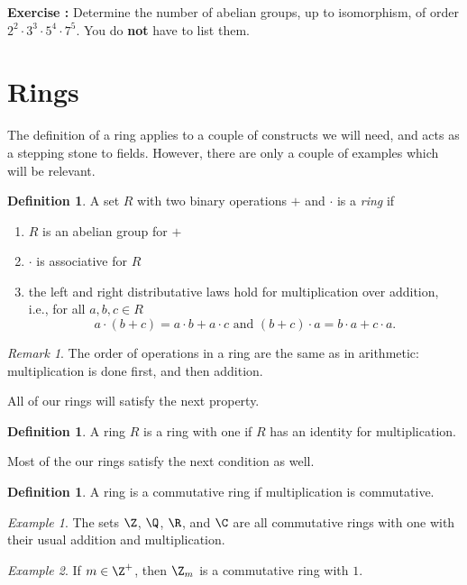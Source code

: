 \documentclass[12pt]{amsart}
\newcommand{\terminology}[1]{\textbf{\textit{#1}}}
\renewcommand{\terminology}[1]{#1}
\newcommand{\term}{\terminology}
\newcounter{probs}
\newenvironment{prob}{%
  \refstepcounter{probs}
  \par\medskip\noindent\textbf{Exercise \theprobs:} }{\par\medskip}
\theoremstyle{plain}
\theoremstyle{definition}
\newtheorem{defn}[thm]{Definition}
\theoremstyle{remark}
\newtheorem*{remark}{Remark}
\newtheorem*{exam}{Example}
\begin{document}
\begin{prob}
 Determine the number of abelian groups, up to isomorphism, of order
 $2^2\cdot 3^3\cdot 5^4\cdot 7^5$.  You do \textbf{not} have to list them.
\end{prob}

\section{Rings}
The definition of a ring applies to a couple of constructs we will
need, and acts as a stepping stone to fields.  However, there are only
a couple of examples which will be relevant.

\begin{defn}
  A set $R$ with two binary operations $+$ and $\cdot$ is a \emph{ring}
  if 
  \begin{enumerate}
  \item $R$ is an abelian group for $+$
  \item $\cdot $ is associative for $R$
  \item the left and right distributative laws hold for multiplication
    over addition, i.e., for all $a,b,c\in R$
    \[a\cdot(b+c) = a\cdot b+a\cdot c \text{ and } (b+c)\cdot a=b\cdot
    a+c\cdot a.\]
  \end{enumerate}
\end{defn}
\begin{remark}
  The order of operations in a ring are the same as in arithmetic:
  multiplication is done first, and then addition.
\end{remark}
All of our rings will satisfy the next property.
\begin{defn}
  A ring $R$ is a \term{ring with one} if $R$ has an identity for
  multiplication.
\end{defn}
Most of the our rings satisfy the next condition as well.
\begin{defn}
  A ring is a \term{commutative ring} if multiplication is
  commutative.
\end{defn}

\begin{exam}
  The sets $\Z$, $\Q$, $\R$, and $\C$ are all commutative rings with
  one with their usual addition and multiplication.
\end{exam}

\begin{exam}
  If $m\in\Z^+$, then $\Z_m$ is a commutative ring with $1$.
\end{exam}
\end{document}

